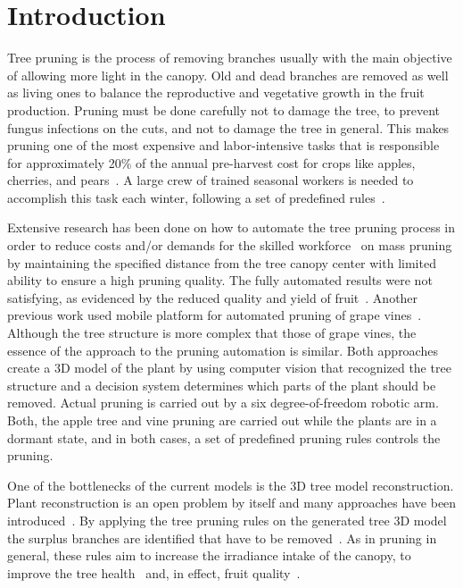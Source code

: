 \section{Introduction}
Tree pruning is the process of removing branches usually with the main
objective of allowing more light in the canopy. Old and dead branches are
removed as well as living ones to balance the reproductive and
vegetative growth in the fruit production. Pruning must be done carefully not to damage the tree, to prevent fungus infections on the cuts, and not to damage the tree in general. This makes pruning one of the most expensive and labor-intensive tasks that is responsible for approximately 20\% of the annual pre-harvest cost for crops like apples, cherries, and pears~\cite{karkee_identification_2014}. A large crew of trained seasonal workers is needed to accomplish this task each winter, following a set of predefined rules~\cite{akbar_novel_2016}. 

Extensive research has been done on how to automate the tree pruning process in order to reduce costs and/or demands for the skilled workforce~\cite{jensen_effects_1980,karkee_identification_2014,moore_mechanical_1958}
on mass pruning by maintaining the specified distance from the tree
canopy center with limited ability to ensure a high pruning quality. The
fully automated results were not satisfying, as evidenced by the reduced quality and
yield of fruit~\cite{karkee_identification_2014}. 
Another previous work used mobile platform for automated pruning of grape vines~\cite{botterill_robot_2017}. 
Although the tree structure is more complex that those of
grape vines, the essence of the approach to the pruning automation is
similar. Both approaches create a 3D model of the plant by using computer vision
that recognized the tree structure and a decision system determines which
parts of the plant should be removed. Actual pruning is carried out by a six degree-of-freedom
robotic arm. Both, the apple tree and vine pruning are carried out while
the plants are in a dormant state, and in both cases, a set of
predefined pruning rules controls the pruning.

One of the bottlenecks of the current models is the 3D tree model
reconstruction. Plant reconstruction is an open problem by itself
and many approaches have been introduced~\cite{livny_automatic_2010,xie_tree_2016,zhang_data-driven_2014}. 
By applying the tree pruning rules on the generated tree 3D model the
surplus branches are identified that have to be removed~\cite{akbar_novel_2016,elfiky_automation_2015,medeiros_modeling_2017}.
As in pruning in general, these rules aim to increase the irradiance intake of the canopy,  to improve the tree health~\cite{simon_does_2006} and, in effect, fruit quality~\cite{bastias_light_2012}. 

